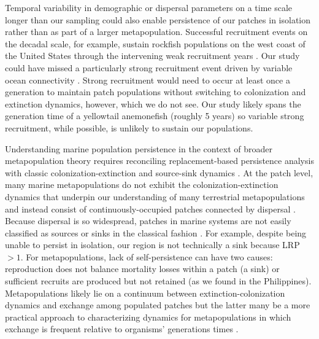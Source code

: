 \documentclass[12pt, oneside]{article}   	%
\begin{document}
Temporal variability in demographic or dispersal parameters on a time scale longer than our sampling could also enable persistence of our patches in isolation \citep[similar to the storage effect,][]{warner1985coexistence} rather than as part of a larger metapopulation. Successful recruitment events on the decadal scale, for example, sustain rockfish populations on the west coast of the United States through the intervening weak recruitment years \citep[e.g.][]{tolimieri2005roles}. Our study could have missed a particularly strong recruitment event driven by variable ocean connectivity \citep[simulations suggest that 20 years are necessary to capture the full extent of ocean variability in the Coral Triangle region surrounding our patches;][]{thompson2018variability}. Strong recruitment would need to occur at least once a generation to maintain patch populations without switching to colonization and extinction dynamics, however, which we do not see. Our study likely spans the generation time of a yellowtail anemonefish (roughly 5 years) so variable strong recruitment, while possible, is unlikely to sustain our populations.

Understanding marine population persistence in the context of broader metapopulation theory requires reconciling replacement-based persistence analysis with classic colonization-extinction and source-sink dynamics \citep{sale2006merging}. At the patch level, many marine metapopulations do not exhibit the colonization-extinction dynamics \citep[or do only on a decades to centuries timescale,][]{smedbol2002myths} that underpin our understanding of many terrestrial metapopulations \citep[e.g,][]{hanski1998metapopulation, moilanen1998long} and instead consist of continuously-occupied patches connected by dispersal \citep{kritzer2006marine}. Because dispersal is so widespread, patches in marine systems are not easily classified as sources or sinks in the classical fashion \citep{figueira2006defining, white2011oceanographic}. For example, despite being unable to persist in isolation, our region is not technically a sink \citep{pulliam1988sources} because LRP $> 1$. For metapopulations, lack of self-persistence can have two causes: reproduction does not balance mortality losses within a patch (a sink) or sufficient recruits are produced but not retained (as we found in the Philippines). Metapopulations likely lie on a continuum between extinction-colonization dynamics and exchange among populated patches \citep{kritzer2006marine} but the latter many be a more practical approach to characterizing dynamics for metapopulations in which exchange is frequent relative to organisms' generations times \citep{hastings_persistence_2006}. %
\end{document}
